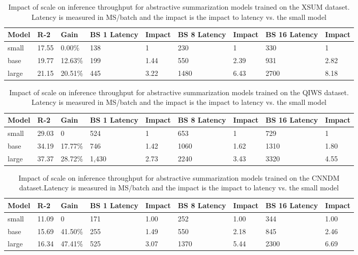 \begin{table*}[!ht]
    \centering
    \small
    \caption{Impact of scale on inference throughput for abstractive summarization models trained on the XSUM dataset. Latency is measured in MS/batch and the impact is the impact to latency vs. the small model}
    \begin{tabular}{|l|l|l|l|l|l|l|l|l|}
    \hline
         Model & R-2 & Gain & BS 1 Latency & Impact & BS 8 Latency & Impact & BS 16 Latency & Impact \\ \hline
        small & 17.55 & 0.00\% & 138 & 1 & 230 & 1 & 330 & 1 \\ \hline
        base & 19.77 & 12.63\% & 199 & 1.44 & 550 & 2.39 & 931 & 2.82 \\ \hline
        large & 21.15 & 20.51\% & 445 & 3.22 & 1480 & 6.43 & 2700 & 8.18 \\ \hline
    \end{tabular}
    \label{tab:cnndm-scale-inference}
\end{table*}
\begin{table*}[!ht]
    \centering
    \small
    \caption{Impact of scale on inference throughput for abstractive summarization models trained on the QIWS dataset. Latency is measured in MS/batch and the impact is the impact to latency vs. the small model}
    \begin{tabular}{|l|l|l|l|l|l|l|l|l|}
    \hline
        Model & R-2 & Gain & BS 1 Latency & Impact & BS 8 Latency & Impact & BS 16 Latency & Impact \\ \hline
        small & 29.03 & 0 & 524 & 1 & 653 & 1 & 729 & 1 \\ \hline
        base & 34.19 & 17.77\% & 746 & 1.42 & 1060 & 1.62 & 1310 & 1.80 \\ \hline
        large & 37.37 & 28.72\% & 1,430 & 2.73 & 2240 & 3.43 & 3320 & 4.55 \\ \hline
    \end{tabular}
    \label{tab:qiws-scale-inference}
\end{table*}
\begin{table*}[!ht]
    \centering
    \small
    \caption{Impact of scale on inference throughput for abstractive summarization models trained on the CNNDM dataset.Latency is measured in MS/batch and the impact is the impact to latency vs. the small model}
    \begin{tabular}{|l|l|l|l|l|l|l|l|l|}
    \hline
         Model & R-2 & Gain & BS 1 Latency & Impact & BS 8 Latency & Impact & BS 16 Latency & Impact \\ \hline
        small & 11.09 & 0 & 171 & 1.00 & 252 & 1.00 & 344 & 1.00 \\ \hline
        base & 15.69 & 41.50\% & 255 & 1.49 & 550 & 2.18 & 845 & 2.46 \\ \hline
        large & 16.34 & 47.41\% & 525 & 3.07 & 1370 & 5.44 & 2300 & 6.69 \\ \hline
    \end{tabular}
    \label{tab:xsum-scale-inference}
\end{table*}
